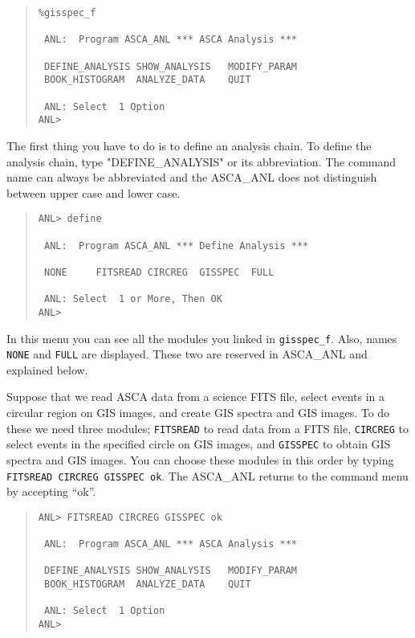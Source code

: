 \begin{quote}\baselineskip 3.2mm\begin{verbatim}
%gisspec_f

 ANL:  Program ASCA_ANL *** ASCA Analysis ***

 DEFINE_ANALYSIS SHOW_ANALYSIS   MODIFY_PARAM
 BOOK_HISTOGRAM  ANALYZE_DATA    QUIT

 ANL: Select  1 Option
ANL> 
\end{verbatim}\end{quote}

The first thing you have to do is to define an analysis chain.
To define the analysis chain,
type "DEFINE\_ANALYSIS" or its abbreviation.
The command name can always be abbreviated
and the ASCA\_ANL does not distinguish between upper case and lower case.

\begin{quote}\baselineskip 3.2mm\begin{verbatim}
ANL> define

 ANL:  Program ASCA_ANL *** Define Analysis ***

 NONE     FITSREAD CIRCREG  GISSPEC  FULL

 ANL: Select  1 or More, Then OK
ANL> 
\end{verbatim}\end{quote}

In this menu you can see all the modules you linked in {\tt gisspec\_f}.
Also, names {\tt NONE} and {\tt FULL} are displayed.
These two are reserved in ASCA\_ANL and explained below.

Suppose that we read ASCA data from a science FITS file,
select events in a circular region on GIS images,
and create GIS spectra and GIS images.
To do these we need three modules;
{\tt FITSREAD} to read data from a FITS file,
{\tt CIRCREG} to select events in the specified circle on GIS images,
and {\tt GISSPEC} to obtain GIS spectra and GIS images.
You can choose these modules in this order
by typing {\tt FITSREAD CIRCREG GISSPEC ok}.
The ASCA\_ANL returns to the command menu by accepting ``ok''.

\begin{quote}\baselineskip 3.2mm\begin{verbatim}
ANL> FITSREAD CIRCREG GISSPEC ok

 ANL:  Program ASCA_ANL *** ASCA Analysis ***

 DEFINE_ANALYSIS SHOW_ANALYSIS   MODIFY_PARAM
 BOOK_HISTOGRAM  ANALYZE_DATA    QUIT

 ANL: Select  1 Option
ANL> 
\end{verbatim}\end{quote}

